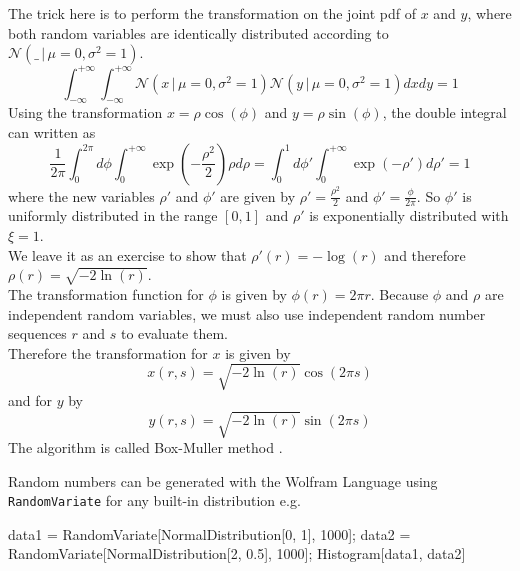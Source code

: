 \documentclass{tstextbook}
\begin{document}
\begin{example}
The trick here is to perform the transformation on the joint pdf of $x$ and $y$, where both random variables are identically distributed according to $\mathcal{N}(\_\,\vert\,\mu=0,\sigma^2=1)$.
\begin{equation}
  \int_{-\infty}^{+\infty}\int_{-\infty}^{+\infty}\mathcal{N}(x\,\vert\,\mu=0,\sigma^2=1)\mathcal{N}(y\,\vert\,\mu=0,\sigma^2=1)dxdy=1
 \end{equation}
 Using the transformation $x=\rho\cos(\phi)$ and $y=\rho\sin(\phi)$, the double integral can written as
\begin{equation}
   \frac{1}{2\pi}\int_{0}^{2\pi}d\phi\int_{0}^{+\infty}\exp\left(-\frac{\rho^2}{2}\right)\rho d\rho=
   \int_{0}^{1}d\phi'\int_{0}^{+\infty}\exp\left(-\rho'\right)d\rho'=1
 \end{equation}
 where the new variables $\rho'$ and $\phi'$ are given by $\rho'=\frac{\rho^2}{2}$ and $\phi'=\frac{\phi}{2\pi}$. So $\phi'$ is uniformly distributed in the range $[0,1]$ and $\rho'$ is exponentially distributed with $\xi=1$.\\

We leave it as an exercise to show that $\rho'(r)=-\log
\left(r\right)$ and therefore $\rho(r)=\sqrt{-2\ln\left(r\right)}$.\\

The transformation function for $\phi$ is given by $\phi(r)=2\pi r$. Because $\phi$ and $\rho$ are independent random variables, we must also use independent random number sequences $r$ and $s$ to evaluate them.\\

Therefore the transformation for $x$ is given by
\begin{equation}
x(r,s)=\sqrt{-2\ln(r)}\cos(2\pi s)
 \end{equation}
 and for $y$ by
 \begin{equation}
y(r,s)=\sqrt{-2\ln(r)}\sin(2\pi s)
 \end{equation}
The algorithm is called Box-Muller method \cite{box1958}.
\end{example}

Random numbers can be generated with the Wolfram Language using \texttt{RandomVariate} for any built-in distribution e.g.

\begin{mathematica}
data1 = RandomVariate[NormalDistribution[0, 1], 1000];
data2 = RandomVariate[NormalDistribution[2, 0.5], 1000];
Histogram[{data1, data2}]
\end{mathematica}
\end{document}
